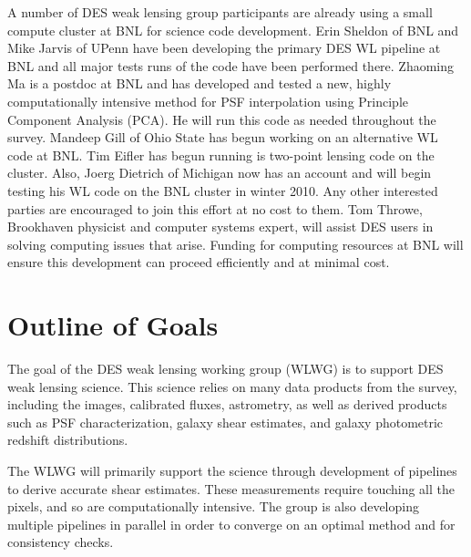 \documentclass[12pt]{article}
\begin{document}
A number of DES weak lensing group participants are already using a small
compute cluster at BNL for science code development.  Erin Sheldon of BNL and
Mike Jarvis of UPenn have been developing the primary DES WL pipeline at BNL
and all major tests runs of the code have been performed there.  Zhaoming Ma is
a postdoc at BNL and has developed and tested a new, highly computationally
intensive method for PSF interpolation using Principle Component Analysis
(PCA).  He will run this code as needed throughout the survey.  Mandeep Gill of
Ohio State has begun working on an alternative WL code at BNL.  Tim Eifler has
begun running is two-point lensing code on the cluster.  Also, Joerg Dietrich
of Michigan now has an account and will begin testing his WL code on the BNL
cluster in winter 2010.  Any other interested parties are encouraged to join
this effort at no cost to them.  Tom Throwe, Brookhaven physicist and computer
systems expert, will assist DES users in solving computing issues that arise.
Funding for computing resources at BNL will ensure this development can proceed
efficiently and at minimal cost.


\section{Outline of Goals}

The goal of the DES weak lensing working group (WLWG) is to support DES weak
lensing science.  This science relies on many data products from the survey,
including the images, calibrated fluxes, astrometry, as well as derived
products such as PSF characterization, galaxy shear estimates, and galaxy
photometric redshift distributions.

The WLWG will primarily support the science through development of pipelines to
derive accurate shear estimates.  These measurements require touching all the
pixels, and so are computationally intensive.  The group is also developing
multiple pipelines in parallel in order to converge on an optimal method and
for consistency checks.  

\begin{comment}
In addition to pipeline development and analysis, a small amount of computing
will be needed for lensing ray tracing simulations.  These will be used to aid
theoretical predictions and test the covariance matrices used in the lensing
analysis.  Calculations predicting the exact hardware needs were not available
at the time of this writing, but the expectation is about 5\% the level
required for the main pipeline processing.  These simulations will be run on
dedicated high memory machines at the University of Pennsylvania.
\end{comment}
\end{document}
